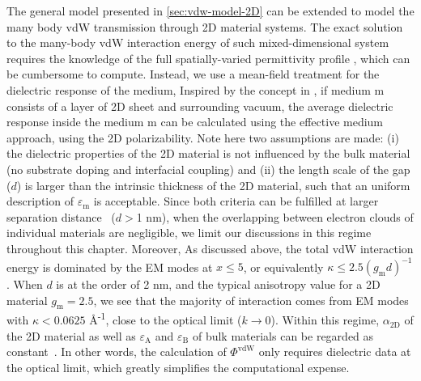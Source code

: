 The general model presented in \autoref{sec:vdw-model-2D} can be
extended to model the many body vdW transmission through 2D material
systems.
%
The exact solution to the many-body vdW interaction energy of such
mixed-dimensional system requires the knowledge of the full
spatially-varied permittivity profile \cite{Podgornik_2004_continuum},
which can be cumbersome to compute.
%
Instead, we use a mean-field treatment for
the dielectric response of the medium, Inspired by the concept in
, if medium m consists of a layer of
2D sheet and surrounding vacuum, the average dielectric response
inside the medium m can be calculated using the effective medium
approach, using the 2D polarizability. 
%
Note here two assumptions are made: (i) the dielectric properties of
the 2D material is not influenced by the bulk material (\ie no
substrate doping and interfacial coupling) and (ii) the length scale
of the gap ($d$) is larger than the intrinsic thickness of the 2D
material, such that an uniform description of $\varepsilon_{\mathrm{m}}$ is acceptable.
%
Since both criteria can be fulfilled at larger separation
distance~\cite{Dobson_2012_rev} (\eg $d>$1 nm), when the overlapping
between electron clouds of individual materials are negligible, we
limit our discussions in this regime throughout this chapter.
%
Moreover, As discussed above, the total vdW interaction energy is dominated by
the EM modes at $x \leq 5$, or equivalently
\(\kappa \leq 2.5 (g_{\mathrm{m}} d)^{-1}\).
%
When $d$ is at the order of 2 nm, and the typical anisotropy value for
a 2D material $g_{\mathrm{m}}=2.5$, we see that the majority of interaction comes
from EM modes with \(\kappa<0.0625\) \AA{}\textsuperscript{-1}, close to the optical limit ($k\to0$).
%
Within this regime, $\alpha_{\mathrm{2D}}$ of the 2D material as well
as $\varepsilon_{\mathrm{A}}$ and $\varepsilon_{\mathrm{B}}$ of bulk
materials can be regarded as
constant~\cite{Li_2005_diele}.
%
In other words, the calculation of $\Phi^{\mathrm{vdW}}$ only requires
dielectric data at the optical limit, which greatly simplifies the
computational expense.

